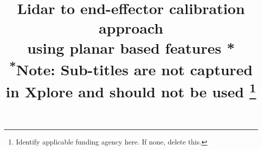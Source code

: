 \documentclass[conference]{IEEEtran}
\begin{document}
\title{  %
  Lidar to end-effector calibration approach\\ using planar based features
  *\\
{\footnotesize \textsuperscript{*}Note: Sub-titles are not captured in Xplore and
should not be used}
\thanks{Identify applicable funding agency here. If none, delete this.}
}
\end{document}
